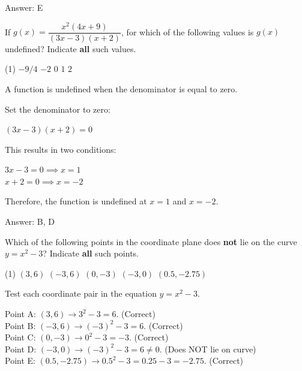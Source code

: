 \documentclass[11pt,paper=a4,answers]{exam}
\begin{document}
\begin{questions}
\begin{solution}
Answer: \colorbox{yellow!100}{E}
\end{solution}

\vspace{1cm}


\question
If $g(x) = \dfrac{x^2 (4x+9)}{(3x-3)(x+2)}$, for which of the following values is $g(x)$ undefined?
Indicate \textbf{all} such values.

\begin{tasks}(1)
\task[A)] $-9/4$
\task[B)] $-2$
\task[C)] $0$
\task[D)] $1$
\task[E)] $2$
\end{tasks}

\begin{solution}
A function is undefined when the denominator is equal to zero.
\vspace{5pt}

Set the denominator to zero:
\begin{center}
$(3x - 3)(x + 2) = 0$
\end{center}
\vspace{5pt}

This results in two conditions:
\begin{center}
$3x - 3 = 0 \implies x = 1$ \\
$x + 2 = 0 \implies x = -2$
\end{center}
\vspace{5pt}

Therefore, the function is undefined at $x = 1$ and $x = -2$.

Answer: \colorbox{yellow!100}{B, D}
\end{solution}

\vspace{1cm}

\question
Which of the following points in the coordinate plane does \textbf{not} lie on the curve $y = x^2 - 3$?
Indicate \textbf{all} such points.

\begin{tasks}(1)
\task[A)] $(3, 6)$
\task[B)] $(-3, 6)$
\task[C)] $(0, -3)$
\task[D)] $(-3, 0)$
\task[E)] $(0.5, -2.75)$
\end{tasks}

\begin{solution}
Test each coordinate pair in the equation $y = x^2 - 3$.
\vspace{5pt}

Point A: $(3, 6) \to 3^2 - 3 = 6$. (Correct) \\
Point B: $(-3, 6) \to (-3)^2 - 3 = 6$. (Correct) \\
Point C: $(0, -3) \to 0^2 - 3 = -3$. (Correct) \\
Point D: $(-3, 0) \to (-3)^2 - 3 = 6 \neq 0$. (Does NOT lie on curve) \\
Point E: $(0.5, -2.75) \to 0.5^2 - 3 = 0.25 - 3 = -2.75$. (Correct)
\vspace{5pt}


\end{solution}
\end{questions}
\end{document}
